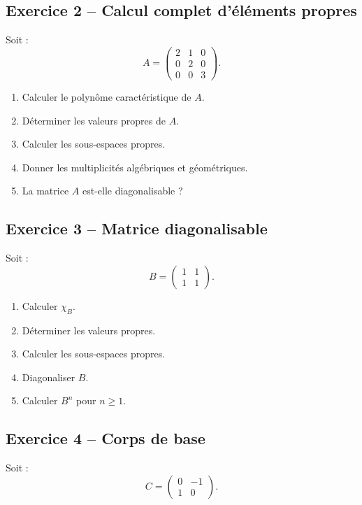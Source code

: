 \documentclass[11pt,a4paper]{article}
\begin{document}
\subsection*{Exercice 2 -- Calcul complet d'éléments propres}

Soit :
\[
A=
\begin{pmatrix}
2&1&0\\
0&2&0\\
0&0&3
\end{pmatrix}.
\]

\begin{enumerate}
    \item Calculer le polynôme caractéristique de \(A\).
    \item Déterminer les valeurs propres de \(A\).
    \item Calculer les sous-espaces propres.
    \item Donner les multiplicités algébriques et géométriques.
    \item La matrice \(A\) est-elle diagonalisable ?
\end{enumerate}

\subsection*{Exercice 3 -- Matrice diagonalisable}

Soit :
\[
B=
\begin{pmatrix}
1&1\\
1&1
\end{pmatrix}.
\]

\begin{enumerate}
    \item Calculer \(\chi_B\).
    \item Déterminer les valeurs propres.
    \item Calculer les sous-espaces propres.
    \item Diagonaliser \(B\).
    \item Calculer \(B^n\) pour \(n\geq1\).
\end{enumerate}

\subsection*{Exercice 4 -- Corps de base}

Soit :
\[
C=
\begin{pmatrix}
0&-1\\
1&0
\end{pmatrix}.
\]
\end{document}

